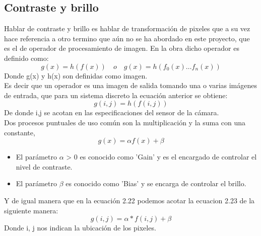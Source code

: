 
\subsection{Contraste y brillo}
Hablar de contraste y brillo es hablar de transformación de pixeles que a su vez hace referencia a otro termino que aún
no se ha abordado en este proyecto, que es el de operador de procesamiento de imagen. En la obra \cite{Book:Richard2011}
dicho operador es definido como:
\begin{equation}
	g(x) = h(f(x)) \quad o \quad g(x) = h(f_0(x) \dots f_n(x))
\end{equation}
Donde g(x) y h(x) son definidas como imagen.\\
Es decir que un operador es una imagen de salida tomando una o varias imágenes de entrada, que para un sistema discreto
la ecuación anterior se obtiene:
\begin{equation}
	g(i,j) = h(f(i,j))
\end{equation}
De donde i,j se acotan en las especificaciones del sensor de la cámara. \\Dos procesos puntuales de uso común
son la multiplicación y la suma con una constante,
\begin{equation}
	g(x) = \alpha f(x) + \beta
\end{equation}
\begin{itemize}
	\item El parámetro $\alpha$ > 0 es conocido como 'Gain' y es el encargado de controlar el nivel de contraste.
	\item El parámetro $\beta$ es conocido como 'Bias' y se encarga de controlar el brillo.
\end{itemize}
Y de igual manera que en la ecuación 2.22 podemos acotar la ecuacion 2.23 de la siguiente manera:
\begin{equation}
	g(i,j) = \alpha * f(i,j) + \beta
\end{equation}
Donde i, j nos indican la ubicación de los pixeles.


